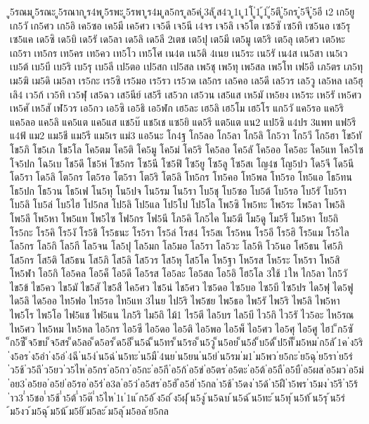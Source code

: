 {ู5รณม
ู5รณะ
ู5รณาก
ูร4พ
ู5รพะ
ู5รพา
ูร4ม
ูล5กร
ูล5ค่
ู3ลั
ูส4ว
ู1เ
ู1โ
ู่1
ู้1
ู๊5ตึ
ู๋5กร
ู๋5จี
ู๋5อี
เ2
เก5ยู
เก5วั
เก5ศว
เก5อิ
เค5ซอ
เค5มี
เค5ศว
เจ5ดี
เจ5นี
เ4จร
เจ5ลิ
เจ5โต
เซ5ซั
เซ5ทิ
เซ5นอ
เซ5รุ
เซ5แค
เด5ซิ
เด5บิ
เด5รั
เด5ลา
เด5ลิ
เด5ลี
2เตช
เต5ปุ
เต5มี
เต5มู
เต5ริ
เต5ลุ
เต5ศว
เต5หะ
เถ5รา
เท5กร
เท5คร
เท5คว
เท5โว
เท5โศ
เน4ต
เน5ติ
4เนย
เน5ระ
เน5รั
เน4ส
เน5สา
เน5เว
เบ5ต้
เบ5บี
เบ5ริ
เบ5รุ
เบ5ลี
เป5ตอ
เป5สก
เป5สล
เพ5ชุ
เพ5ทุ
เพ5สล
เพ5โท
เฟ5อี
เภ5ตร
เภ5ทุ
เม5ฆิ
เม5ดิ
เม5ลา
เร5กะ
เร5ซิ
เร5มอ
เร5รว
เร5วด
เล5กร
เล5คอ
เล5ดี
เล5วร
เล5วู
เล5หล
เล5ฮุ
เลิ4
เว5ก้
เว5ทิ
เว5ฬุ
เส5ฉว
เส5นีย์
เส5รี
เส5วก
เส5วน
เส5แส
เห5มั
เห5ยง
เห5ระ
เห5รั
เห5ศว
เห5ศั
เห5สั
เฬ5วร
เอ5กว
เอ5ซิ
เอ5ธิ
เอ5ฬก
เฮ5ละ
เฮ5ลิ
เฮ5โม
เฮ5โร
แก5วั
แค5รอ
แค5ริ
แค5ลอ
แค5ลิ
แค5แต
แค5แส
แช5บ๊
แช5เช
แซ5ยิ
แด5รี
แต5แต
แน2
แป5ซิ
แ4ปร
3แพท
แฟ5รี
แ4ฟ้
แม2
แม5ชี
แม5รี
แม5เร
แม่3
แอ5นะ
โก4ฐ
โก5ลอ
โก5ลา
โก5ลิ
โก5วา
โก5วี
โก5ฮา
โข5ทั
โข5ภิ
โข5เภ
โข5โล
โค5ตม
โค5ติ
โค5มู
โค5ม่
โค5ริ
โค5ลอ
โค5ลั
โค5ออ
โค5อะ
โค5แท
โค5ไซ
โจ5ปก
โฉ5เบ
โช5ดึ
โช5ห่
โซ5กร
โซ5นี
โซ5ฟิ
โซ5ยู
โซ5ลู
โซ5สเ
โญ4ช
โญ5ปว
โด5จี
โด5นี
โด5รา
โด5ลิ
โต5กร
โต5รอ
โต5รา
โต5ริ
โต5ลิ
โท5กร
โท5คอ
โท5พล
โท5รอ
โท5แอ
โธ5ทน
โธ5ปก
โธ5วน
โธ5เฟ
โน5ทุ
โน5ปจ
โน5รม
โน5รา
โบ5ชุ
โบ5ซอ
โบ5ต้
โบ5รอ
โบ5รั
โบ5รา
โบ5ลิ
โบ5ล่
โบ5ไฮ
โป5กส
โป5ลิ
โป5แล
โป5โป
โป5โล
โพ5ซิ
โพ5ทะ
โพ5ระ
โพ5ลา
โพ5ลิ
โพ5ลี
โพ5หา
โพ5แท
โพ5ไซ
โฟ5กร
โฟ5นี
โภ5คิ
โภ5ไค
โม5ฆี
โม5ดู
โม5ร็
โม5หา
โย5ถิ
โร5กะ
โร5คิ
โร5งั
โร5ชิ
โร5ธนะ
โร5รา
โร5ล่
โรส4
โร5สเ
โร5หน
โร5อี
โร5ฮิ
โร5แม
โร5ไล
โล5กร
โล5กิ
โล5กี
โล5จน
โล5ปุ
โล5มก
โล5มอ
โล5รา
โล5วะ
โล5หิ
โว5นอ
โศ5ธน
โศ5ภิ
โส5กร
โส5ติ
โส5ธน
โส5ภิ
โส5ลิ
โส5วร
โส5หุ
โส5โค
โห5ฐา
โห5รส
โห5ระ
โห5รา
โห5สิ
โห5ฬา
โอ5กิ
โอ5คล
โอ5ค็
โอ5ดี
โอ5รส
โอ5ละ
โอ5สถ
โอ5อิ
โฮ5โล
3ใช้
1ให
ไก5ลา
ไก5วั
ไข5ข้
ไข5คว
ไข5มั
ไข5สั
ไข5สื
ไค5ศว
ไช5น่
ไช5ศว
ไซ5ดอ
ไซ5บอ
ไซ5บี
ไซ5ปร
ได5ฟุ
ได5ฟู
ได5ลิ
ได5ออ
ไท5ฟอ
ไท5รอ
ไท5แท
3ไนย
ไป5ริ
ไพ5ชย
ไพ5ธอ
ไพ5รั
ไพ5ริ
ไพ5ลิ
ไพ5หา
ไพ5โร
ไพ5โอ
ไฟ5แช
ไฟ5แน
ไภ5ริ
ไม5ถิ
ไม้1
ไร5ตี
ไล5บร
ไล5บี
ไว5กิ
ไว5รั
ไว5อะ
ไห5รณ
ไห5ศว
ไห5หม
ไห5หล
ไอ5กร
ไอ5ซี
ไอ5ดอ
ไอ5ติ
ไอ5พอ
ไอ5พ็
ไอ5ศว
ไอ5ศุ
ไอ5ศู
ไฮ1
็ก5ซั
็ก5ซี
็จ5ขบ
็จ5สร
็ด5ลอ
็ด5อร
็ด5อึ
็น5ฉ่
็น5ทร
็น5รอ
็น5วู
็น5อย
็น5อ้
็บ5ด้
็ป5ท็
็ม5หม
่ก5ลั
่1ค
่ง5ริ
่ง5อร
่ง5อำ
่ง5อ่
่4ฉี
่น5ง่
่น5ฉ่
่น5ทะ
่น5มื
่4นย
่น5ยน
่น5ย่
่น5รม
่ม1
่ม5พว
่ย5กะ
่ย5ฉุ
่ย5รา
่ย5ร่
่ว5ช้
่ว5ถึ
่ว5ยว
่ว5ไห
่อ5กร
่อ5กว
่อ5กะ
่อ5กี
่อ5ก้
่อ5ข่
่อ5ตร
่อ5ตะ
่อ5ต้
่อ5ถื
่อ5บื
่อ5ผส
่อ5มว
่อ5ม่
่อย3
่อ5ยอ
่อ5ย่
่อ5รอ
่อ5ร่
่อ3ล
่อ5ว่
่อ5สร
่อ5ฮั
่อ5ฮ่
่า5กล
่า5ช้
่า5ดง
่า5ด้
่า5ฝื
่า5พร
่า5มง
่า5รึ
่า5ร้
่าว3
่ำ5ชอ
่ำ5ช้
่ำ5ต้
่ำ5ต๊
่ำ5ไห
่1เ
่1แ
้ก5อ้
้ง5ถ่
้ง5ฝุ
้น5งู
้น5ฉบ
้น5ฉ่
้น5ทะ
้น5ทุ
้น5ท้
้น5รุ
้น5ร่
้ม5งว
้ม5ฉุ
้ม5น้
้ม5ยิ
้ม5ละ
้ม5ลุ
้ม5อล
้ย5กล
}

